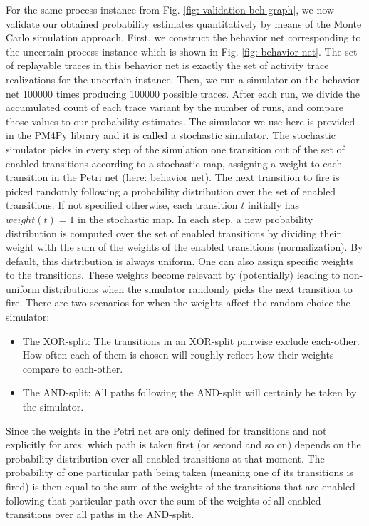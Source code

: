 For the same process instance from Fig. \ref{fig: validation beh graph}, we now validate our obtained probability estimates quantitatively by means of the Monte Carlo simulation approach.
First, we construct the behavior net corresponding to the uncertain process instance which is shown in Fig. \ref{fig: behavior net}.
The set of replayable traces in this behavior net is exactly the set of activity trace realizations for the uncertain instance.
Then, we run a simulator on the behavior net 100000 times producing 100000 possible traces.
After each run, we divide the accumulated count of each trace variant by the number of runs, and compare those values to our probability estimates.
The simulator we use here is provided in the PM4Py library and it is called a stochastic simulator.
The stochastic simulator picks in every step of the simulation one transition out of the set of enabled transitions according to a stochastic map, assigning a weight to each transition in the Petri net (here: behavior net). 
The next transition to fire is picked randomly following a probability distribution over the set of enabled transitions. 
If not specified otherwise, each transition $t$ initially has $weight(t)=1$ in the stochastic map. 
In each step, a new probability distribution is computed over the set of enabled transitions by dividing their weight with the sum of the weights of the enabled transitions (normalization). 
By default, this distribution is always uniform. 
One can also assign specific weights to the transitions. 
These weights become relevant by (potentially) leading to non-uniform distributions when the simulator randomly picks the next transition to fire. 
There are two scenarios for when the weights affect the random choice the simulator: 
\begin{itemize}
\item The XOR-split:
The transitions in an XOR-split pairwise exclude each-other. 
How often each of them is chosen will roughly reflect how their weights compare to each-other.
\item The AND-split:
All paths following the AND-split will certainly be taken by the simulator. 
\end{itemize}
Since the weights in the Petri net are only defined for transitions and not explicitly for arcs, which path is taken first (or second and so on) depends on the probability distribution over all enabled transitions at that moment. 
The probability of one particular path being taken (meaning one of its transitions is fired) is then equal to the sum of the weights of the transitions that are enabled following that particular path over the sum of the weights of all enabled transitions over all paths in the AND-split.
